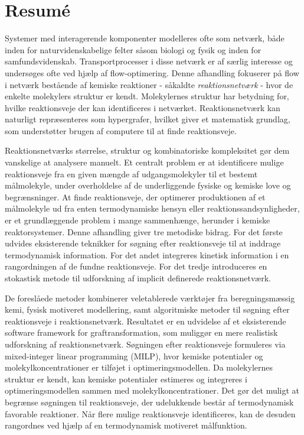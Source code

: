 \chapter{Resumé}
\label{ch:abstract_da}

Systemer med interagerende komponenter modelleres ofte som netværk, både inden for naturvidenskabelige felter såsom biologi og fysik og inden for samfundsvidenskab. Transportprocesser i disse netværk er af særlig interesse og undersøges ofte ved hjælp af flow-optimering. Denne afhandling fokuserer på flow i netværk bestående af kemiske reaktioner - såkaldte \emph{reaktionsnetværk} - hvor de enkelte molekylers struktur er kendt. Molekylernes struktur har betydning for, hvilke reaktionsveje der kan identificeres i netværket. Reaktionsnetværk kan naturligt repræsenteres som hypergrafer, hvilket giver et matematisk grundlag, som understøtter brugen af computere til at finde reaktionsveje.

Reaktionsnetværks størrelse, struktur og kombinatoriske kompleksitet gør dem vanskelige at analysere manuelt. Et centralt problem er at identificere mulige reaktionsveje fra en given mængde af udgangsmolekyler til et bestemt målmolekyle, under overholdelse af de underliggende fysiske og kemiske love og begrænsninger. At finde reaktionsveje, der optimerer produktionen af et målmolekyle ud fra enten termodynamiske hensyn eller reaktionssandsynligheder, er et grundlæggende problem i mange sammenhænge, herunder i kemiske reaktorsystemer. Denne afhandling giver tre metodiske bidrag. For det første udvides eksisterende teknikker for søgning efter reaktionsveje til at inddrage termodynamisk information. For det andet integreres kinetisk information i en rangordningen af de fundne reaktionsveje. For det tredje introduceres en stokastisk metode til udforskning af implicit definerede reaktionsnetværk.

De foreslåede metoder kombinerer veletablerede værktøjer fra beregningsmæssig kemi, fysisk motiveret modellering, samt algoritmiske metoder til søgning efter reaktionsveje i reaktionsnetværk. Resultatet er en udvidelse af et eksisterende software framework for graftransformation, som muliggør en mere realistisk udforskning af reaktionsnetværk. Søgningen efter reaktionsveje formuleres via mixed-integer linear programming (MILP), hvor kemiske potentialer og molekylkoncentrationer er tilføjet i optimeringsmodellen. Da molekylernes struktur er kendt, kan kemiske potentialer estimeres og integreres i optimeringsmodellen sammen med molekylkoncentrationer. Det gør det muligt at begrænse søgningen til reaktionsveje, der udelukkende består af termodynamisk favorable reaktioner. Når flere mulige reaktionsveje identificeres, kan de desuden rangordnes ved hjælp af en termodynamisk motiveret målfunktion.

